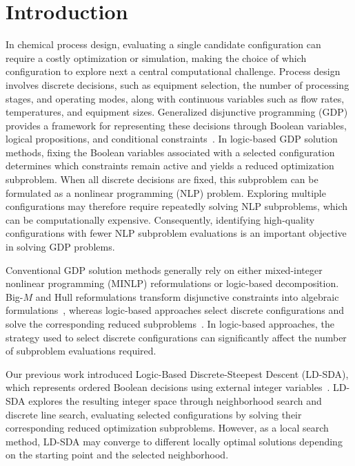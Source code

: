 \documentclass{article}
\begin{document}
\section{Introduction}
In chemical process design, evaluating a single candidate configuration can require a costly optimization or simulation, making the choice of which configuration to explore next a central computational challenge. 
Process design involves discrete decisions, such as equipment selection, the number of processing stages, and operating modes, along with continuous variables such as flow rates, temperatures, and equipment sizes. 
Generalized disjunctive programming (GDP) provides a framework for representing these decisions through Boolean variables, logical propositions, and conditional constraints~\cite{raman1994modelling}. 
In logic-based GDP solution methods, fixing the Boolean variables associated with a selected configuration determines which constraints remain active and yields a reduced optimization subproblem. 
When all discrete decisions are fixed, this subproblem can be formulated as a nonlinear programming (NLP) problem. 
Exploring multiple configurations may therefore require repeatedly solving NLP subproblems, which can be computationally expensive. 
Consequently, identifying high-quality configurations with fewer NLP subproblem evaluations is an important objective in solving GDP problems.

Conventional GDP solution methods generally rely on either mixed-integer nonlinear programming (MINLP) reformulations or logic-based decomposition. 
Big-\(M\) and Hull reformulations transform disjunctive constraints into algebraic formulations~\cite{raman1994modelling,grossmann2003hull}, whereas logic-based approaches select discrete configurations and solve the corresponding reduced subproblems~\cite{turkay1996logic,bergamini2005logic}. 
In logic-based approaches, the strategy used to select discrete configurations can significantly affect the number of subproblem evaluations required.

Our previous work introduced Logic-Based Discrete-Steepest Descent (LD-SDA), which represents ordered Boolean decisions using external integer variables~\cite{ovalle2025logic}. 
LD-SDA explores the resulting integer space through neighborhood search and discrete line search, evaluating selected configurations by solving their corresponding reduced optimization subproblems. 
However, as a local search method, LD-SDA may converge to different locally optimal solutions depending on the starting point and the selected neighborhood.
\end{document}
